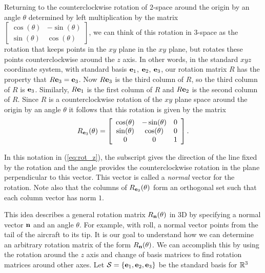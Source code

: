 Returning to the counterclockwise rotation of $2$-space around the origin by an angle $\theta$ determined by left multiplication by the matrix $\left[ \begin{array}{cr} \cos(\theta)&-\sin(\theta) \\ \sin(\theta)&\cos(\theta) \end{array} \right]$, we can think of this rotation in $3$-space as the rotation that keeps points in the $xy$ plane in the $xy$ plane, but rotates these points counterclockwise around the $z$ axis. In other words, in the standard $xyz$ coordinate system, with standard basis $\mathbf{e}_1$, $\mathbf{e}_2$, $\mathbf{e}_3$, our rotation matrix $R$ has the property that $R \mathbf{e}_3 = \mathbf{e}_3$. Now $R \mathbf{e}_3$ is the third column of $R$, so the third column of $R$ is $\mathbf{e}_3$. Similarly, $R \mathbf{e}_1$ is the first column of $R$ and $R \mathbf{e}_2$ is the second column of $R$. Since $R$ is a counterclockwise rotation of the $xy$ plane space around the origin by an angle $\theta$ it follows that this rotation is given by the matrix
\begin{equation} \label{eq:rot_z}
R_{\mathbf{e}_3}(\theta) = \left[ \begin{array}{ccc} \cos(\theta)&-\sin(\theta)&0 \\ \sin(\theta)&\cos(\theta)&0 \\ 0&0&1 \end{array} \right].
\end{equation}

In this notation in (\ref{eq:rot_z}), the subscript gives the direction of the line fixed by the rotation and the angle provides the counterclockwise rotation in the plane perpendicular to this vector. This vector is called a \emph{normal} vector for the rotation. Note also that the columns of $R_{\mathbf{e}_3}(\theta)$ form an orthogonal set such that each column vector has norm $1$. 

This idea describes a general rotation matrix $R_{\mathbf{n}}(\theta)$ in 3D by specifying a normal vector $\mathbf{n}$ and an angle $\theta$. For example, with roll, a normal vector points from the tail of the aircraft to its tip. It is our goal to understand how we can determine an arbitrary rotation matrix of the form $R_{\mathbf{n}}(\theta)$. We can accomplish this by using the rotation around the $z$ axis and change of basis matrices to find rotation matrices around other axes. Let $\mathcal{S} = \{\mathbf{e}_1, \mathbf{e}_2, \mathbf{e}_3\}$ be the standard basis for $\mathbb{R}^3$

